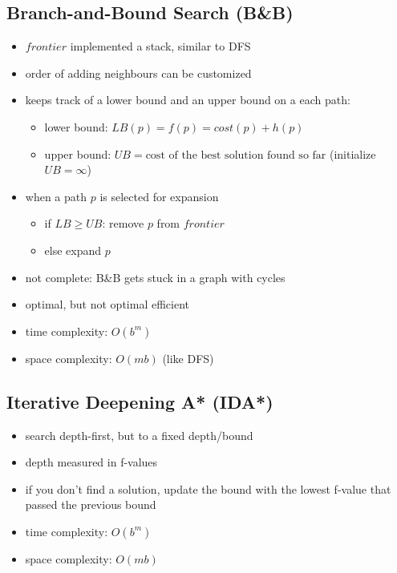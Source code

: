 \documentclass{article}
\begin{document}
\subsection{Branch-and-Bound Search (B\&B)}

\begin{itemize}
    \item $frontier$ implemented a stack, similar to DFS
    \item order of adding neighbours can be customized
    \item keeps track of a lower bound and an upper bound on a each path:
        \begin{itemize}
            \item lower bound: $LB(p) = f(p) = cost(p) + h(p)$
            \item upper bound: $UB = \text{cost of the best solution found so far}$ (initialize $UB = \infty$)
        \end{itemize}
    \item when a path $p$ is selected for expansion
        \begin{itemize}
            \item if $LB \geq UB$: remove $p$ from $frontier$
            \item else expand $p$
        \end{itemize}
    \item not complete: B\&B gets stuck in a graph with cycles
    \item optimal, but not optimal efficient
    \item time complexity: $O(b^m)$
    \item space complexity: $O(mb)$ (like DFS)
\end{itemize}

\subsection{Iterative Deepening A* (IDA*)}

\begin{itemize}
    \item search depth-first, but to a fixed depth/bound
    \item depth measured in f-values
    \item if you don't find a solution, update the bound with the lowest f-value that passed the previous bound
    \item time complexity: $O(b^m)$
    \item space complexity: $O(mb)$
\end{itemize}
\end{document}
